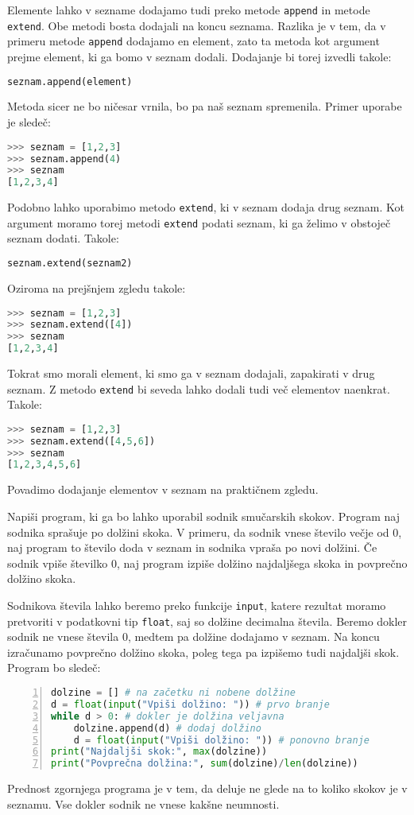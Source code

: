 Elemente lahko v sezname dodajamo tudi preko metode \texttt{append} in metode \texttt{extend}. Obe metodi bosta dodajali na koncu seznama. Razlika je v tem, da v primeru metode \texttt{append} dodajamo en element, zato ta metoda kot argument prejme element, ki ga bomo v seznam dodali. Dodajanje bi torej izvedli takole:
\begin{lstlisting}[language=Python]
seznam.append(element)
\end{lstlisting}
Metoda sicer ne bo ničesar vrnila, bo pa naš seznam spremenila. Primer uporabe je sledeč:
\begin{lstlisting}[language=Python]
>>> seznam = [1,2,3]
>>> seznam.append(4)
>>> seznam
[1,2,3,4]
\end{lstlisting}
Podobno lahko uporabimo metodo \texttt{extend}, ki v seznam dodaja drug seznam. Kot argument moramo torej metodi \texttt{extend} podati seznam, ki ga želimo v obstoječ seznam dodati. Takole:
\begin{lstlisting}[language=Python]
seznam.extend(seznam2)
\end{lstlisting}
Oziroma na prejšnjem zgledu takole:
\begin{lstlisting}[language=Python]
>>> seznam = [1,2,3]
>>> seznam.extend([4])
>>> seznam
[1,2,3,4]
\end{lstlisting}
Tokrat smo morali element, ki smo ga v seznam dodajali, zapakirati v drug seznam. Z metodo \texttt{extend} bi seveda lahko dodali tudi več elementov naenkrat. Takole: 
\begin{lstlisting}[language=Python]
>>> seznam = [1,2,3]
>>> seznam.extend([4,5,6])
>>> seznam
[1,2,3,4,5,6]
\end{lstlisting}


Povadimo dodajanje elementov v seznam na praktičnem zgledu.
\begin{zgled}
Napiši program, ki ga bo lahko uporabil sodnik smučarskih skokov. Program naj sodnika sprašuje po dolžini skoka. V primeru, da sodnik vnese število večje od 0, naj program to število doda v seznam in sodnika vpraša po novi dolžini. Če sodnik vpiše številko 0, naj program izpiše dolžino najdaljšega skoka in povprečno dolžino skoka.
\end{zgled}
\begin{resitev}
Sodnikova števila lahko beremo preko funkcije \texttt{input}, katere rezultat moramo pretvoriti v podatkovni tip \texttt{float}, saj so dolžine decimalna števila. Beremo dokler sodnik ne vnese števila 0, medtem pa dolžine dodajamo v seznam. Na koncu izračunamo povprečno dolžino skoka, poleg tega pa izpišemo tudi najdaljši skok. Program bo sledeč:
\begin{lstlisting}[language=Python,numbers=left]
dolzine = [] # na začetku ni nobene dolžine
d = float(input("Vpiši dolžino: ")) # prvo branje
while d > 0: # dokler je dolžina veljavna
    dolzine.append(d) # dodaj dolžino
    d = float(input("Vpiši dolžino: ")) # ponovno branje
print("Najdaljši skok:", max(dolzine))
print("Povprečna dolžina:", sum(dolzine)/len(dolzine))
\end{lstlisting}
\end{resitev}
Prednost zgornjega programa je v tem, da deluje ne glede na to koliko skokov je v seznamu. Vse dokler sodnik ne vnese kakšne neumnosti.

